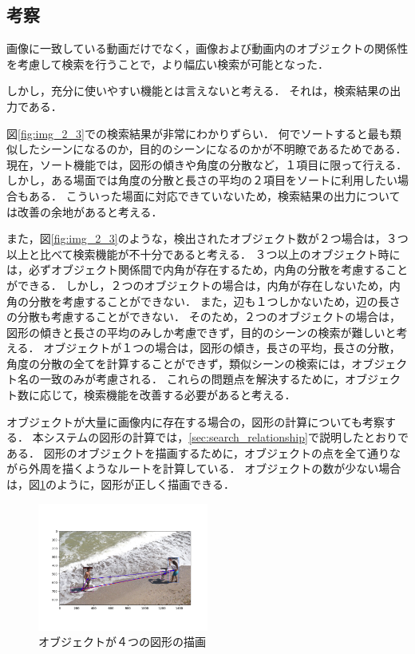\documentclass[a4j,12pt,dvipdfmx]{jreport}
\begin{document}
\subsection{考察}
画像に一致している動画だけでなく，画像および動画内のオブジェクトの関係性を考慮して検索を行うことで，より幅広い検索が可能となった．

しかし，充分に使いやすい機能とは言えないと考える．
それは，検索結果の出力である．

図\ref{fig:img_2_3}での検索結果が非常にわかりずらい．
何でソートすると最も類似したシーンになるのか，目的のシーンになるのかが不明瞭であるためである．
現在，ソート機能では，図形の傾きや角度の分散など，１項目に限って行える．
しかし，ある場面では角度の分散と長さの平均の２項目をソートに利用したい場合もある．
こういった場面に対応できていないため，検索結果の出力については改善の余地があると考える．

また，図\ref{fig:img_2_3}のような，検出されたオブジェクト数が２つ場合は，３つ以上と比べて検索機能が不十分であると考える．
３つ以上のオブジェクト時には，必ずオブジェクト関係間で内角が存在するため，内角の分散を考慮することができる．
しかし，２つのオブジェクトの場合は，内角が存在しないため，内角の分散を考慮することができない．
また，辺も１つしかないため，辺の長さの分散も考慮することができない．
そのため，２つのオブジェクトの場合は，図形の傾きと長さの平均のみしか考慮できず，目的のシーンの検索が難しいと考える．
オブジェクトが１つの場合は，図形の傾き，長さの平均，長さの分散，角度の分散の全てを計算することができず，類似シーンの検索には，オブジェクト名の一致のみが考慮される．
これらの問題点を解決するために，オブジェクト数に応じて，検索機能を改善する必要があると考える．

オブジェクトが大量に画像内に存在する場合の，図形の計算についても考察する．
本システムの図形の計算では，\ref{sec:search_relationship}で説明したとおりである．
図形のオブジェクトを描画するために，オブジェクトの点を全て通りながら外周を描くようなルートを計算している．
オブジェクトの数が少ない場合は，図\ref{fig:img_2_4_4}のように，図形が正しく描画できる．
\begin{figure}[H]
  \centering
  \includegraphics[width=0.5\textwidth]{image/result_2_4_4.png}
  \caption{オブジェクトが４つの図形の描画}
  \label{fig:img_2_4_4}
\end{figure}
\end{document}
